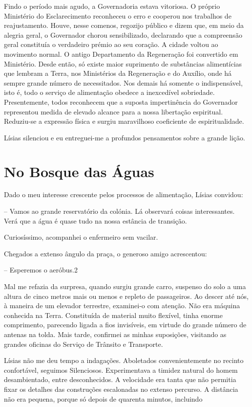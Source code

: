 \documentclass[portuguese,12pt,a4paper]{scrbook}
\begin{document}
	
	Findo o período mais agudo, a Governadoria estava vitoriosa. O próprio Ministério do Esclarecimento reconheceu o erro e cooperou nos trabalhos de reajustamento. Houve, nesse comenos, regozijo público e dizem que, em meio da alegria geral, o Governador chorou sensibilizado, declarando que a compreensão geral constituía o verdadeiro prémio ao seu coração. A cidade voltou ao movimento normal. O antigo Departamento da Regeneração foi convertido em Ministério. Desde então, só existe maior suprimento de substâncias alimentícias que lembram a Terra, nos Ministérios da Regeneração e do Auxílio, onde há sempre grande número de necessitados. Nos demais há somente o indispensável, isto é, todo o serviço de alimentação obedece a inexcedível sobriedade. Presentemente, todos reconhecem que a suposta impertinência do Governador representou medida de elevado alcance para a nossa libertação espiritual. Reduziu-se a expressão física e surgiu maravilhoso coeficiente de espiritualidade.
	
	Lísias silenciou e eu entreguei-me a profundos pensamentos sobre a grande lição.
	
	
	\chapter{No Bosque das Águas}
	
	Dado o meu interesse crescente pelos processos de alimentação, Lísias convidou:
	
	– Vamos ao grande reservatório da colónia. Lá observará coisas interessantes. Verá que a água é quase tudo na nossa estância de transição.
	
	Curiosíssimo, acompanhei o enfermeiro sem vacilar.
	
	Chegados a extenso ângulo da praça, o generoso amigo acrescentou:
	
	– Esperemos o aeróbus.2
	
	Mal me refazia da surpresa, quando surgiu grande carro, suspenso do solo a uma altura de cinco metros mais ou menos e repleto de passageiros. Ao descer até nós, à maneira de um elevador terrestre, examinei-o com atenção. Não era máquina conhecida na Terra. Constituída de material muito flexível, tinha enorme comprimento, parecendo ligada a fios invisíveis, em virtude do grande número de antenas na tolda. Mais tarde, confirmei as minhas suposições, visitando as grandes oficinas do Serviço de Trânsito e Transporte.
	
	Lísias não me deu tempo a indagações. Aboletados convenientemente no recinto confortável, seguimos Silenciosos. Experimentava a timidez natural do homem desambientado, entre desconhecidos. A velocidade era tanta que não permitia fixar os detalhes das construções escalonadas no extenso percurso. A distância não era pequena, porque só depois de quarenta minutos, incluindo
	
\end{document}
